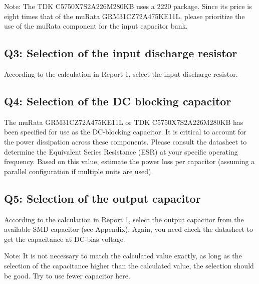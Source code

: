 \documentclass{PELsmallreport}
\begin{document}
Note: The TDK C5750X7S2A226M280KB uses a 2220 package. Since its price is eight times that of the muRata GRM31CZ72A475KE11L, please prioritize the use of the muRata component for the input capacitor bank.

 \quad {} \quad  {}\quad  {}\hfill{}

\subsection{Q3: Selection of the input discharge resistor}
According to the calculation in Report 1, select the input discharge resistor.\\

 \quad  {}\quad \hfill{}


\subsection{Q4: Selection of the DC blocking capacitor}

The muRata GRM31CZ72A475KE11L or TDK C5750X7S2A226M280KB has been specified for use as the DC-blocking capacitor. It is critical to account for the power dissipation across these components. Please consult the datasheet to determine the Equivalent Series Resistance (ESR) at your specific operating frequency. Based on this value, estimate the power loss per capacitor (assuming a parallel configuration if multiple units are used). \\

 \quad {} \quad {}\quad {}\hfill{}

\subsection{Q5: Selection of the output capacitor}
According to the calculation in Report 1, select the output capacitor from the available SMD capacitor (see Appendix). Again, you need check the datasheet to get the capacitance at DC-bias voltage.

Note: It is not necessary to match the calculated value exactly, as long as the selection of the capacitance higher than the calculated value, the selection should be good. Try to use fewer capacitor here. 
\end{document}
